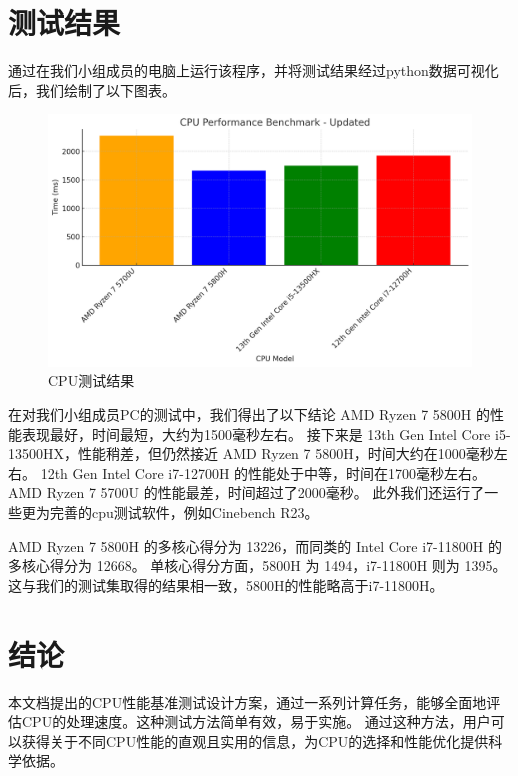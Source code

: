 \documentclass{ctexart}
\begin{document}
\section{测试结果}
通过在我们小组成员的电脑上运行该程序，并将测试结果经过python数据可视化后，我们绘制了以下图表。
\begin{figure}[H]
    \centering
    \includegraphics[width=1\textwidth]{3bae2083-77d4-4bf9-a107-23f6ebdfb357.png}
    \caption{CPU测试结果}
    \label{fig:image1}
    \end{figure}
在对我们小组成员PC的测试中，我们得出了以下结论
AMD Ryzen 7 5800H 的性能表现最好，时间最短，大约为1500毫秒左右。
接下来是 13th Gen Intel Core i5-13500HX，性能稍差，但仍然接近 AMD Ryzen 7 5800H，时间大约在1000毫秒左右。
12th Gen Intel Core i7-12700H 的性能处于中等，时间在1700毫秒左右。
AMD Ryzen 7 5700U 的性能最差，时间超过了2000毫秒。
此外我们还运行了一些更为完善的cpu测试软件，例如Cinebench R23。

AMD Ryzen 7 5800H 的多核心得分为 13226，而同类的 Intel Core i7-11800H 的多核心得分为 12668。
单核心得分方面，5800H 为 1494，i7-11800H 则为 1395。
这与我们的测试集取得的结果相一致，5800H的性能略高于i7-11800H。
\section{结论}
本文档提出的CPU性能基准测试设计方案，通过一系列计算任务，能够全面地评估CPU的处理速度。这种测试方法简单有效，易于实施。
通过这种方法，用户可以获得关于不同CPU性能的直观且实用的信息，为CPU的选择和性能优化提供科学依据。
\end{document}
